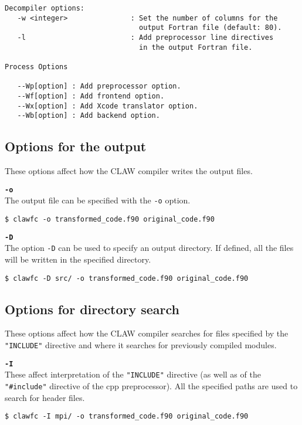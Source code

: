 \documentclass{article}
\begin{document}
\begin{lstlisting}
Decompiler options:
   -w <integer>               : Set the number of columns for the 
                                output Fortran file (default: 80).
   -l                         : Add preprocessor line directives 
                                in the output Fortran file.

Process Options

   --Wp[option] : Add preprocessor option.
   --Wf[option] : Add frontend option.
   --Wx[option] : Add Xcode translator option.
   --Wb[option] : Add backend option.
\end{lstlisting}

\subsection{Options for the output}
These options affect how the CLAW compiler writes the output files.

\textbf{\texttt{-o}}\\
The output file can be specified with the \texttt{-o} option. 
\begin{lstlisting}
$ clawfc -o transformed_code.f90 original_code.f90
\end{lstlisting}

\textbf{\texttt{-D}}\\
The option \texttt{-D} can be used to specify an output directory. If defined, all the files 
will be written in the specified directory.

\begin{lstlisting}
$ clawfc -D src/ -o transformed_code.f90 original_code.f90
\end{lstlisting}

\subsection{Options for directory search}
These options affect how the CLAW compiler searches for files specified by the
\texttt{"INCLUDE"} directive and where it searches for previously compiled modules.

\textbf{\texttt{-I}}\\
These affect interpretation of the \texttt{"INCLUDE"} directive (as well as of the \texttt{"\#include"} directive of the cpp preprocessor).
All the specified paths are used to search for header files.
\begin{lstlisting}
$ clawfc -I mpi/ -o transformed_code.f90 original_code.f90
\end{lstlisting}
\end{document}
